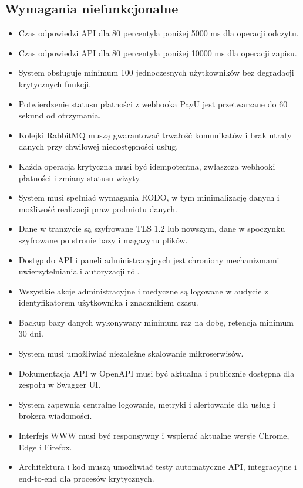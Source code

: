\documentclass[12pt]{article}
\begin{document}
\subsection{Wymagania niefunkcjonalne}
\begin{itemize}
\item Czas odpowiedzi API dla 80 percentyla poniżej 5000 ms dla operacji odczytu.
\item Czas odpowiedzi API dla 80 percentyla poniżej 10000 ms dla operacji zapisu.
\item System obsługuje minimum 100 jednoczesnych użytkowników bez degradacji krytycznych funkcji.
\item Potwierdzenie statusu płatności z webhooka PayU jest przetwarzane do 60 sekund od otrzymania.
\item Kolejki RabbitMQ muszą gwarantować trwałość komunikatów i brak utraty danych przy chwilowej niedostępności usług.
\item Każda operacja krytyczna musi być idempotentna, zwłaszcza webhooki płatności i zmiany statusu wizyty.
\item System musi spełniać wymagania RODO, w tym minimalizację danych i możliwość realizacji praw podmiotu danych.
\item Dane w tranzycie są szyfrowane TLS 1.2 lub nowszym, dane w spoczynku szyfrowane po stronie bazy i magazynu plików.
\item Dostęp do API i paneli administracyjnych jest chroniony mechanizmami uwierzytelniania i autoryzacji ról.
\item Wszystkie akcje administracyjne i medyczne są logowane w audycie z identyfikatorem użytkownika i znacznikiem czasu.
\item Backup bazy danych wykonywany minimum raz na dobę, retencja minimum 30 dni.
\item System musi umożliwiać niezależne skalowanie mikroserwisów.
\item Dokumentacja API w OpenAPI musi być aktualna i publicznie dostępna dla zespołu w Swagger UI.
\item System zapewnia centralne logowanie, metryki i alertowanie dla usług i brokera wiadomości.
\item Interfejs WWW musi być responsywny i wspierać aktualne wersje Chrome, Edge i Firefox.
\item Architektura i kod muszą umożliwiać testy automatyczne API, integracyjne i end-to-end dla procesów krytycznych.
 \end{itemize}
\end{document}
